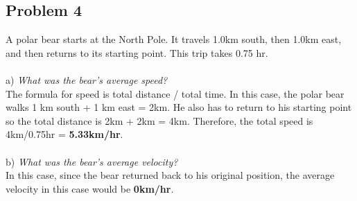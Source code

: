 \documentclass{article}
\begin{document}
\subsection{Problem 4} 
A polar bear starts at the North Pole. It travels 1.0km south, then 1.0km east, and then returns to its starting point. This trip takes 0.75 hr.\\ \\
a) \textit{What was the bear's average speed?} \\ 
The formula for speed is total distance / total time. In this case, the polar bear walks 1 km south + 1 km east = 2km. He also has to return to his starting point so the total distance is 2km + 2km = 4km. Therefore, the total speed is 4km/0.75hr = \textbf{5.33km/hr}. \\ \\ 
b) \textit{What was the bear's average velocity?} \\
In this case, since the bear returned back to his original position, the average velocity in this case would be \textbf{0km/hr}.\\ 
\end{document}
